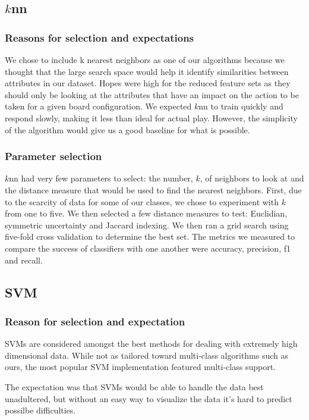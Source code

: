 \documentclass[]{article}   %
\begin{document}
\subsection{$k$nn}
\subsubsection{Reasons for selection and expectations}
We chose to include k nearest neighbors as one of our algorithms because we thought that the large search space 
would help it identify similarities between attributes in our dataset. Hopes were high for the reduced feature 
sets as they should only be looking at the attributes that have an impact on the action to be taken for a given 
board configuration.  We expected $k$nn to train quickly and respond slowly, making it less than ideal for actual play. 
However, the simplicity of the algorithm would give us a good baseline for what is possible.

\subsubsection{Parameter selection}

$k$nn had very few parameters to select: the number, $k$, of neighbors to look at and the distance measure that would 
be used to find the nearest neighbors. First, due to the scarcity of data for some of our classes, we chose to 
experiment with $k$ from one to five. We then selected a few distance measures to test: Euclidian, symmetric uncertainty 
and Jaccard indexing. We then ran a grid search using five-fold cross validation to determine the best set. The metrics 
we measured to compare the success of classifiers with one another were accuracy, precision, f1 and recall. 

\subsection{SVM}
\subsubsection{Reason for selection and expectation}
SVMs are considered amongst the best methods for dealing with extremely high dimensional data.  While not as tailored toward multi-class algorithms such as ours, the most popular SVM implementation featured multi-class support.  

The expectation was that SVMs would be able to handle the data best unadultered, but without an easy way to visualize the data it's hard to predict possilbe difficulties.
\end{document}
